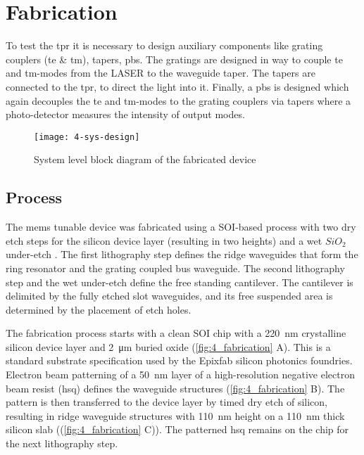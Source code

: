 \documentclass[../report.tex]{subfiles}
\begin{document}
	
	
\chapter{Fabrication}
To test the \gls{tpr} it is necessary to design auxiliary components like grating couplers (\gls{te} \& \gls{tm}), tapers, \gls{pbs}. The gratings are designed in way to couple \gls{te} and \gls{tm}-modes from the LASER to the waveguide taper. The tapers are connected to the \gls{tpr}, to direct the light into it. Finally, a \gls{pbs} is designed which again decouples the \gls{te} and \gls{tm}-modes to the grating couplers via tapers where a photo-detector measures the intensity of output modes.  

\begin{figure}[H] %
	\centering
	\texttt{[image: 4-sys-design]}
	\caption{System level block diagram of the fabricated device}
	\label{fig:4_sys_design}
\end{figure}

\section{Process}\label{sec:fab_process}
The \gls{mems} tunable device was fabricated using a SOI-based process with two dry etch steps for the silicon device layer (resulting in two heights) and a wet $SiO_2$ under-etch \cite{errando-herranz_low-power_2015}. The first lithography step defines the ridge waveguides that form the ring resonator and the grating coupled bus waveguide.  The second lithography step and the wet under-etch define the free standing cantilever. The cantilever is delimited by the fully etched slot waveguides, and its free suspended area is determined by the placement of etch holes.

\par The fabrication process starts with a clean SOI chip with a \SI{220}{\nano \meter} crystalline silicon device layer and \SI{2}{\micro \meter} buried oxide (\ref{fig:4_fabrication} A). This is a standard substrate specification used by the Epixfab silicon photonics foundries. Electron beam patterning of a \SI{50}{\nano \meter} layer of a high-resolution negative electron beam resist (\gls{hsq}) defines the waveguide structures (\ref{fig:4_fabrication} B). The pattern is then transferred to the device layer by timed dry etch of silicon, resulting in ridge waveguide structures with \SI{110}{\nano \meter} height on a \SI{110}{\nano \meter} thick silicon slab ((\ref{fig:4_fabrication} C)). The patterned \gls{hsq} remains on the chip for the next lithography step.
\end{document}
